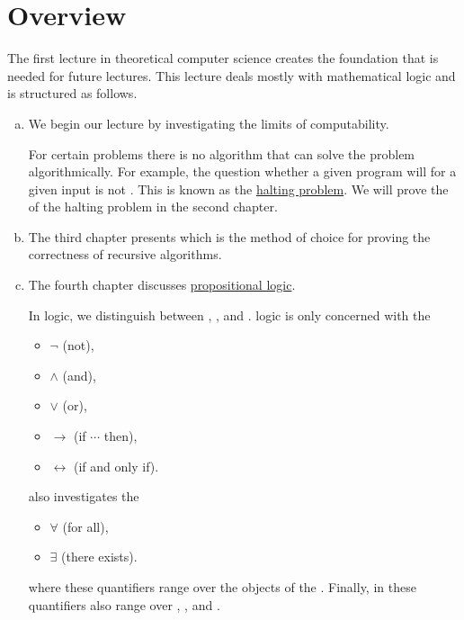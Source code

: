 \section{Overview} 
The first lecture in theoretical computer science creates the foundation that is needed for future lectures.
This lecture deals mostly with mathematical logic and is structured as follows.
\begin{enumerate}[(a)]
\item We begin our lecture by investigating the limits of computability.

      For certain problems there is no algorithm that can solve the problem algorithmically. 
      For example, the question whether a given program will  for a given input is not
      .  This is known as the \href{https://en.wikipedia.org/wiki/Halting_problem}{halting problem}.  
      We will prove the  of the halting problem in the second chapter. 
\item The third chapter presents  which is the method of choice for proving the
      correctness of recursive algorithms.
\item The fourth chapter discusses \href{https://en.wikipedia.org/wiki/Propositional_calculus}{propositional logic}.

      In logic, we distinguish between  ,
      , and .   logic is only
      concerned with the 
      \begin{itemize}
      \item $\neg$ (not), 
      \item $\wedge$ (and),
      \item $\vee$ (or),
      \item $\rightarrow$ (if $\cdots$ then),
      \item $\leftrightarrow$ (if and only if).
      \end{itemize}
       also investigates the 
      \begin{itemize}
      \item $\forall$ (for all),
      \item $\exists$ (there exists).
      \end{itemize}
      \hspace*{1.3cm}
      where these quantifiers range over the objects of the .
      Finally, in  these quantifiers also range over , , and
      . 


\end{enumerate}
